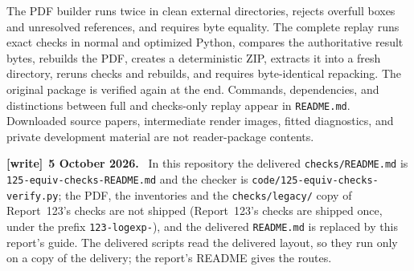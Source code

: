 \documentclass[11pt,letterpaper]{article}
\theoremstyle{remark}\newtheorem{remark}[theorem]{Remark}
\newcommand{\1}{\mathbf1}
\newenvironment{writenote}[1][]{\par\smallskip\begingroup\small
 \noindent\textbf{[write]}\if\relax\detokenize{#1}\relax\else~\textbf{#1.}\fi\ }%
 {\par\endgroup\smallskip}
\newcommand{\file}[1]{\textup{\nolinkurl{#1}}}
\begin{document}
The PDF builder runs twice in clean external directories, rejects
overfull boxes and unresolved references, and requires byte equality.
The complete replay runs exact checks in normal and optimized Python,
compares the authoritative result bytes, rebuilds the PDF, creates a
deterministic ZIP, extracts it into a fresh directory, reruns checks and
rebuilds, and requires byte-identical repacking. The original package is
verified again at the end. Commands, dependencies, and distinctions
between full and checks-only replay appear in \texttt{README.md}.
Downloaded source papers, intermediate render images, fitted diagnostics,
and private development material are not reader-package contents.
\begin{writenote}[5 October 2026]
In this repository the delivered \file{checks/README.md} is \file{125-equiv-checks-README.md} and the checker is \file{code/125-equiv-checks-verify.py}; the PDF, the inventories and the \file{checks/legacy/} copy of Report~123's checks are not shipped (Report~123's checks are shipped once, under the prefix \file{123-logexp-}), and the delivered \file{README.md} is replaced by this report's guide. The delivered scripts read the delivered layout, so they run only on a copy of the delivery; the report's README gives the routes.
\end{writenote}
\end{document}

